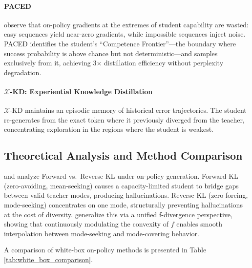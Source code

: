 \documentclass{article} %
\begin{document}
\paragraph{PACED}
\citet{2603.11178} observe that on-policy gradients at the extremes of student capability are wasted: easy sequences yield near-zero gradients, while impossible sequences inject noise. PACED identifies the student's ``Competence Frontier''---the boundary where success probability is above chance but not deterministic---and samples exclusively from it, achieving 3$\times$ distillation efficiency without perplexity degradation.

\paragraph{$\mathcal{X}$-KD: Experiential Knowledge Distillation}
$\mathcal{X}$-KD \citep{2602.12674} maintains an episodic memory of historical error trajectories. The student re-generates from the exact token where it previously diverged from the teacher, concentrating exploration in the regions where the student is weakest.

\subsection{Theoretical Analysis and Method Comparison}
\label{subsec:theory_whitebox}

\citet{2404.02657} and \citet{2402.11890} analyze Forward vs.\ Reverse KL under on-policy generation. Forward KL (zero-avoiding, mean-seeking) causes a capacity-limited student to bridge gaps between valid teacher modes, producing hallucinations. Reverse KL (zero-forcing, mode-seeking) concentrates on one mode, structurally preventing hallucinations at the cost of diversity. \citet{2307.15190} generalize this via a unified f-divergence perspective, showing that continuously modulating the convexity of $f$ enables smooth interpolation between mode-seeking and mode-covering behavior.

A comparison of white-box on-policy methods is presented in Table \ref{tab:white_box_comparison}.
\end{document}

